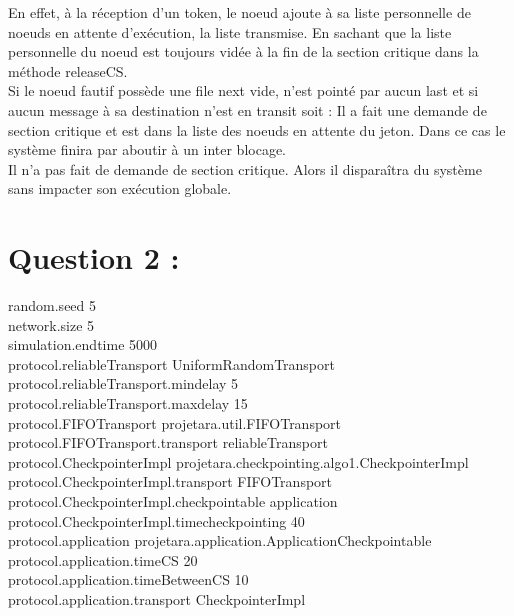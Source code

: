 \documentclass[11pt,a4paper]{report}
\begin{document}
En effet, à la réception d'un token, le noeud ajoute à sa liste personnelle de noeuds en attente d'exécution, la liste transmise. En sachant que la liste personnelle du noeud est toujours vidée à la fin de la section critique dans la méthode releaseCS.\\

Si le noeud fautif possède une file next vide, n’est pointé par aucun last et si aucun message à sa destination n’est en transit soit :
 Il a fait une demande de section critique et est dans la liste des noeuds en attente du jeton. Dans ce cas le système finira par aboutir à un inter blocage.\\

 Il n'a pas fait de demande de section critique. Alors il disparaîtra du système sans impacter son exécution globale.\\


\section{Question 2 :}

random.seed 5\\
network.size 5\\
simulation.endtime 5000\\

protocol.reliableTransport UniformRandomTransport\\
protocol.reliableTransport.mindelay 5\\
protocol.reliableTransport.maxdelay 15\\

protocol.FIFOTransport projetara.util.FIFOTransport\\
protocol.FIFOTransport.transport reliableTransport\\

protocol.CheckpointerImpl projetara.checkpointing.algo1.CheckpointerImpl\\
protocol.CheckpointerImpl.transport FIFOTransport\\
protocol.CheckpointerImpl.checkpointable application\\
protocol.CheckpointerImpl.timecheckpointing 40\\

protocol.application projetara.application.ApplicationCheckpointable\\
protocol.application.timeCS 20\\
protocol.application.timeBetweenCS 10\\
protocol.application.transport CheckpointerImpl\\
\end{document}
